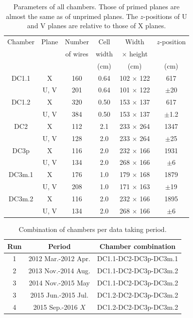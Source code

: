 \begin{table}[bthp]\centering
  \caption{Parameters of all chambers.
    Those of primed planes are almost the same as of unprimed planes.
    The $z$-positions of U and V planes are relative to those of X planes.
  }
  \label{table:cham:param}
  \begin{tabular}{cc|cccc}
    \hline
    Chamber & Plane & Number   & Cell  & Width            & $z$-position \\
            &       & of wires & width & $\times$ height  &      \\ 
            &       &          & (cm)  & (cm)             & (cm) \\ 
    \hline
    DC1.1    & X     & 160      & 0.64  & 102 $\times$ 122 &  617    \\
             & U, V  & 201      & 0.64  & 101 $\times$ 122 & $\pm$20 \\
    DC1.2    & X     & 320      & 0.50  & 153 $\times$ 137 &  617    \\
             & U, V  & 384      & 0.50  & 153 $\times$ 137 & $\pm$1.2 \\
    DC2      & X     & 112      & 2.1   & 233 $\times$ 264 & 1347    \\
             & U, V  & 128      & 2.0   & 233 $\times$ 264 & $\pm$25 \\
    DC3p     & X     & 116      & 2.0   & 232 $\times$ 166 & 1931    \\
             & U, V  & 134      & 2.0   & 268 $\times$ 166 & $\pm$6  \\
    DC3m.1   & X     & 176      & 1.0   & 179 $\times$ 168 & 1879    \\
             & U, V  & 208      & 1.0   & 171 $\times$ 163 & $\pm$19 \\
    DC3m.2   & X     & 116      & 2.0   & 232 $\times$ 166 & 1895    \\
             & U, V  & 134      & 2.0   & 268 $\times$ 166 & $\pm$6  \\
    \hline
  \end{tabular}
\end{table}

\begin{table}[bthp]\centering
  \caption{Combination of chambers per data taking period.}
  \label{tab:cham:comb1}
  \begin{tabular}{ccc}
    \hline
    Run & Period & Chamber combination \\
    \hline
    1 & 2012 Mar.-2012 Apr.  &  DC1.1-DC2-DC3p-DC3m.1 \\
    2 & 2013 Nov.-2014 Aug.  &  DC1.1-DC2-DC3p-DC3m.2 \\
    3 & 2014 Nov.-2015 May   &  DC1.1-DC2-DC3p-DC3m.2 \\
    3 & 2015 Jun.-2015 Jul.  &  DC1.2-DC2-DC3p-DC3m.2 \\
    4 & 2015 Sep.-2016 $X$   &  DC1.2-DC2-DC3p-DC3m.2 \\
    \hline
  \end{tabular}
\end{table}

